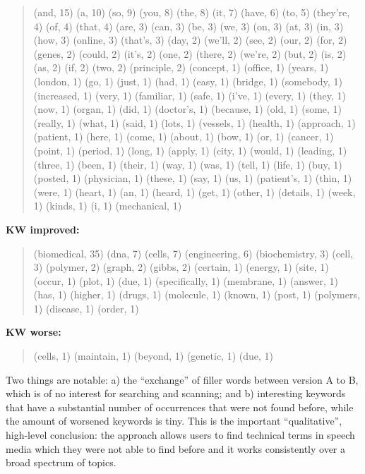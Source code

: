 \documentclass[]{article}
\begin{document}
\begin{quote}
(and, 15) (a, 10) (so, 9) (you, 8) (the, 8) (it, 7) (have, 6) (to, 5)
(they're, 4) (of, 4) (that, 4) (are, 3) (can, 3) (be, 3) (we, 3) (on, 3)
(at, 3) (in, 3) (how, 3) (online, 3) (that's, 3) (day, 2) (we'll, 2)
(see, 2) (our, 2) (for, 2) (genes, 2) (could, 2) (it's, 2) (one, 2)
(there, 2) (we're, 2) (but, 2) (is, 2) (as, 2) (if, 2) (two, 2)
(principle, 2) (concept, 1) (office, 1) (years, 1) (london, 1) (go, 1)
(just, 1) (had, 1) (easy, 1) (bridge, 1) (somebody, 1) (increased, 1)
(very, 1) (familiar, 1) (safe, 1) (i've, 1) (every, 1) (they, 1) (now,
1) (organ, 1) (did, 1) (doctor's, 1) (because, 1) (old, 1) (some, 1)
(really, 1) (what, 1) (said, 1) (lots, 1) (vessels, 1) (health, 1)
(approach, 1) (patient, 1) (here, 1) (come, 1) (about, 1) (bow, 1) (or,
1) (cancer, 1) (point, 1) (period, 1) (long, 1) (apply, 1) (city, 1)
(would, 1) (leading, 1) (three, 1) (been, 1) (their, 1) (way, 1) (was,
1) (tell, 1) (life, 1) (buy, 1) (posted, 1) (physician, 1) (these, 1)
(say, 1) (us, 1) (patient's, 1) (thin, 1) (were, 1) (heart, 1) (an, 1)
(heard, 1) (get, 1) (other, 1) (details, 1) (week, 1) (kinds, 1) (i, 1)
(mechanical, 1)
\end{quote}

\textbf{KW improved:}

\begin{quote}
(biomedical, 35) (dna, 7) (cells, 7) (engineering, 6) (biochemistry, 3)
(cell, 3) (polymer, 2) (graph, 2) (gibbs, 2) (certain, 1) (energy, 1)
(site, 1) (occur, 1) (plot, 1) (due, 1) (specifically, 1) (membrane, 1)
(answer, 1) (has, 1) (higher, 1) (drugs, 1) (molecule, 1) (known, 1)
(post, 1) (polymers, 1) (disease, 1) (order, 1)
\end{quote}

\textbf{KW worse:}

\begin{quote}
(cells, 1) (maintain, 1) (beyond, 1) (genetic, 1) (due, 1)
\end{quote}

\normalsize{}

Two things are notable: a) the ``exchange'' of filler words between
version A to B, which is of no interest for searching and scanning; and
b) interesting keywords that have a substantial number of occurrences
that were not found before, while the amount of worsened keywords is
tiny. This is the important ``qualitative'', high-level conclusion: the
approach allows users to find technical terms in speech media which they
were not able to find before and it works consistently over a broad
spectrum of topics.
\end{document}
